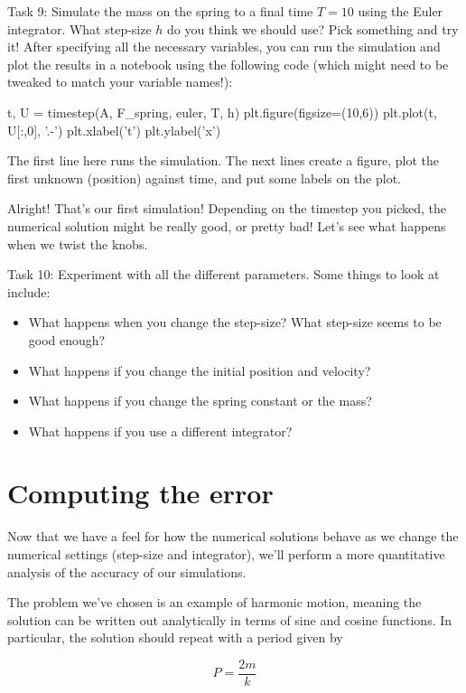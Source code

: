 \documentclass[main.tex]{subfiles}
\begin{document}
Task 9: 
Simulate the mass on the spring to a final time $T=10$ using the Euler integrator.
What step-size $h$ do you think we should use?
Pick something and try it!
After specifying all the necessary variables, you can run the simulation and plot the results in a notebook using the following code (which might need to be tweaked to match your variable names!):

\begin{python}
 t, U = timestep(A, F_spring, euler, T, h)
 plt.figure(figsize=(10,6))
 plt.plot(t, U[:,0], '.-')
 plt.xlabel('t')
 plt.ylabel('x')
\end{python}

The first line here runs the simulation.
The next lines create a figure, plot the first unknown (position) against time, and put some labels on the plot.

Alright!
That's our first simulation!
Depending on the timestep you picked, the numerical solution might be really good, or pretty bad!
Let's see what happens when we twist the knobs.

Task 10:
Experiment with all the different parameters.
Some things to look at include:
\begin{itemize}
\item What happens when you change the step-size?  What step-size seems to be good enough?
\item What happens if you change the initial position and velocity?
\item What happens if you change the spring constant or the mass?
\item What happens if you use a different integrator?
\end{itemize}

\section{Computing the error}

Now that we have a feel for how the numerical solutions behave as we change the numerical settings (step-size and integrator), we'll perform a more quantitative analysis of the accuracy of our simulations.

The problem we've chosen is an example of harmonic motion, meaning the solution can be written out analytically in terms of sine and cosine functions.
In particular, the solution should repeat with a period given by

\begin{equation}
    P = \frac{2 m}{k}
\end{equation}
\end{document}
